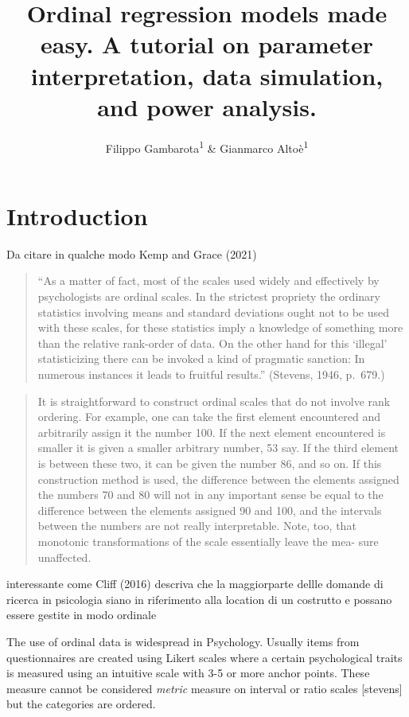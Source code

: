 \documentclass[
  man,floatsintext]{apa6}
\title{Ordinal regression models made easy. A tutorial on parameter interpretation, data simulation, and power analysis.}
\author{Filippo Gambarota\textsuperscript{1} \& Gianmarco Altoè\textsuperscript{1}}
\date{}
\affiliation{\vspace{0.5cm}\textsuperscript{1} Department of Developmental Psychology and Socialization, University of Padova, Italy}
\begin{document}
\maketitle

\section{Introduction}\label{introduction}

Da citare in qualche modo Kemp and Grace (2021)

\begin{quote}
``As a matter of fact, most of the scales used widely and effectively by psychologists are ordinal scales. In the strictest propriety the ordinary statistics involving means and standard deviations ought not to be used with these scales, for these statistics imply a knowledge of something more than the relative rank-order of data. On the other hand for this `illegal' statisticizing there can be invoked a kind of pragmatic sanction: In numerous instances it leads to fruitful results.'' (Stevens, 1946, p.~679.)
\end{quote}

\begin{quote}
It is straightforward to construct ordinal scales that do not involve rank ordering. For example, one can take the first element encountered and arbitrarily assign it the number 100. If the next element encountered is smaller it is given a smaller arbitrary number, 53 say. If the third element is between these two, it can be given the number 86, and so on. If this construction method is used, the difference between the elements assigned the numbers 70 and 80 will not in any important sense be equal to the difference between the elements assigned 90 and 100, and the intervals between the numbers are not really interpretable. Note, too, that monotonic transformations of the scale essentially leave the mea- sure unaffected.
\end{quote}

interessante come Cliff (2016) descriva che la maggiorparte dellle domande di ricerca in psicologia siano in riferimento alla location di un costrutto e possano essere gestite in modo ordinale

The use of ordinal data is widespread in Psychology. Usually items from questionnaires are created using Likert scales where a certain psychological traits is measured using an intuitive scale with 3-5 or more anchor points. These measure cannot be considered \emph{metric} measure on interval or ratio scales {[}stevens{]} but the categories are ordered.
\end{document}
